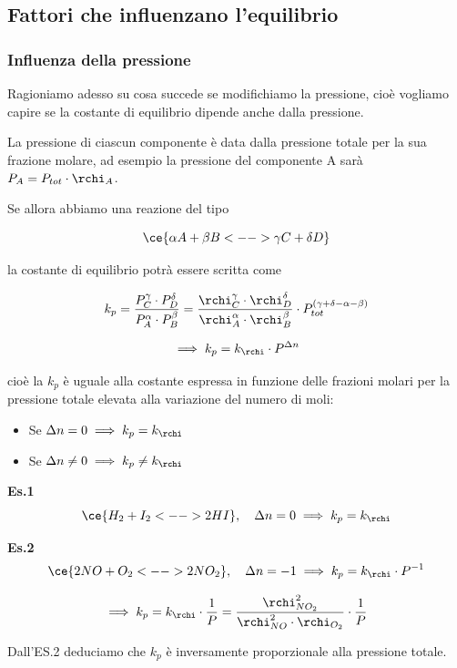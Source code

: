 \subsection{Fattori che influenzano l'equilibrio}

\subsubsection{Influenza della pressione}
Ragioniamo adesso su cosa succede se modifichiamo la pressione, cioè vogliamo capire se la costante di equilibrio dipende anche dalla pressione.

La pressione di ciascun componente è data dalla pressione totale per la sua frazione molare, ad esempio la pressione del componente A sarà $P_A = P_{tot} \cdot \rchi_A$.

Se allora abbiamo una reazione del tipo

$$\ce{\alpha A + \beta B <--> \gamma C + \delta D}$$

la costante di equilibrio potrà essere scritta come

$$k_p = \frac{P_C^{\gamma} \cdot P_D^{\delta}}{P_A^{\alpha} \cdot P_B^{\beta}} = \frac{\rchi_C^{\gamma} \cdot \rchi_D^{\delta}}{\rchi_A^{\alpha} \cdot \rchi_B^{\beta}} \cdot P_{tot}^{(\gamma + \delta - \alpha - \beta)}$$

$$\implies k_p = k_{\rchi} \cdot P^{\Delta n}$$

cioè la $k_p$ è uguale alla costante espressa in funzione delle frazioni molari per la pressione totale elevata alla variazione del numero di moli:

\begin{itemize}
    \item Se $\Delta n = 0 \implies k_p = k_{\rchi}$
    \item Se $\Delta n \neq 0 \implies k_p \neq k_{\rchi}$
\end{itemize}

\vspace{0.2cm}\textbf{Es.1}
$$\ce{H_2 + I_2 <--> 2HI}, \quad \Delta n = 0 \implies k_p = k_{\rchi}$$

\textbf{Es.2}
$$\ce{2NO + O_2 <--> 2NO_2}, \quad \Delta n = -1 \implies k_p = k_{\rchi} \cdot P^{-1}$$

$$\implies k_p = k_{\rchi} \cdot \frac{1}{P}= \frac{\rchi_{NO_2}^2}{\rchi_{NO}^2 \cdot \rchi_{O_2}} \cdot \frac{1}{P}$$

Dall'ES.2 deduciamo che $k_p$ è inversamente proporzionale alla pressione totale.

